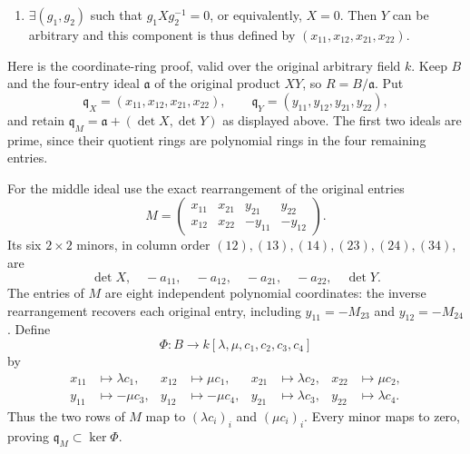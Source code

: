 \begin{example}
\begin{enumerate}
$$\begin{aligned}
\end{aligned}
$$
The proof below shows that this is prime and cuts out that closure.
The sixth equation is already a consequence of the first four on
the open set where $X$ is nonzero: writing $a_{ij}=(XY)_{ij}$,
the exact matrix identity $X\det(Y)=(XY)\operatorname{adj}(Y)$ gives
$$
\begin{aligned}
x_{11}\det Y&=a_{11}y_{22}-a_{12}y_{21},&
x_{12}\det Y&=-a_{11}y_{12}+a_{12}y_{11},\\
x_{21}\det Y&=a_{21}y_{22}-a_{22}y_{21},&
x_{22}\det Y&=-a_{21}y_{12}+a_{22}y_{11}.
\end{aligned}
$$
Thus on each standard open where an entry of $X$ is invertible, the
original five-equation ideal and $\mathfrak q_M$ give the same quotient.
No sixth equation is discarded in the closure.
\item $\exists (g_1, g_2)$ such that $g_1Xg_2^{-1} = 0$, or
equivalently, $X = 0$. Then $Y$ can be arbitrary and this component
is thus defined by $(x_{11}, x_{12}, x_{21}, x_{22})$.
\end{enumerate}

\medskip\noindent
Here is the coordinate-ring proof, valid over the original arbitrary
field $k$. Keep $B$ and the four-entry ideal $\mathfrak a$ of the
original product $XY$, so $R=B/\mathfrak a$. Put
$$
\mathfrak q_X=(x_{11},x_{12},x_{21},x_{22}),\qquad
\mathfrak q_Y=(y_{11},y_{12},y_{21},y_{22}),
$$
and retain $\mathfrak q_M=\mathfrak a+(\det X,\det Y)$ as displayed
above. The first two ideals are prime, since their quotient rings
are polynomial rings in the four remaining entries.

For the middle ideal use the exact rearrangement of the original entries
$$
M=\begin{pmatrix}
x_{11}&x_{21}&y_{21}&y_{22}\\
x_{12}&x_{22}&-y_{11}&-y_{12}
\end{pmatrix}.
$$
Its six $2\times2$ minors, in column order
$(12),(13),(14),(23),(24),(34)$, are
$$
\det X,\quad-a_{11},\quad-a_{12},\quad-a_{21},\quad-a_{22},\quad\det Y.
$$
The entries of $M$ are eight independent polynomial coordinates:
the inverse rearrangement recovers each original entry, including
$y_{11}=-M_{23}$ and $y_{12}=-M_{24}$. Define
$$
\Phi:B\longrightarrow k[\lambda,\mu,c_1,c_2,c_3,c_4]
$$
by
$$
\begin{aligned}
x_{11}&\mapsto\lambda c_1,&x_{12}&\mapsto\mu c_1,&
x_{21}&\mapsto\lambda c_2,&x_{22}&\mapsto\mu c_2,\\
y_{11}&\mapsto-\mu c_3,&y_{12}&\mapsto-\mu c_4,&
y_{21}&\mapsto\lambda c_3,&y_{22}&\mapsto\lambda c_4.
\end{aligned}
$$
Thus the two rows of $M$ map to $(\lambda c_i)_i$ and
$(\mu c_i)_i$. Every minor maps to zero, proving
$\mathfrak q_M\subset\ker\Phi$.


\end{example}
